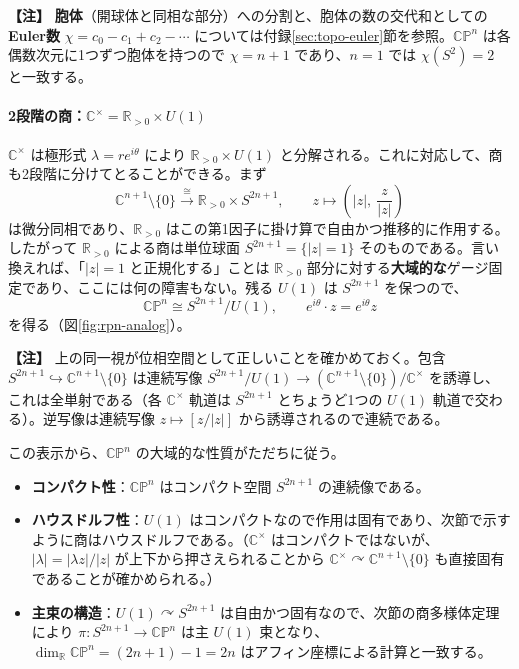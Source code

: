 \documentclass[uplatex, dvipdfmx, book]{jsbook}
\newenvironment{note}{\vspace{1ex}\par\footnotesize\noindent\textbf{【注】}}{\par\vspace{1ex}}
\begin{document}
\begin{note}
\textbf{胞体}（開球体と同相な部分）への分割と、胞体の数の交代和としての\textbf{Euler数} $\chi = c_0 - c_1 + c_2 - \cdots$ については付録\ref{sec:topo-euler}節を参照。$\mathbb{CP}^n$ は各偶数次元に1つずつ胞体を持つので $\chi = n + 1$ であり、$n = 1$ では $\chi(S^2) = 2$ と一致する。
\end{note}

\paragraph{2段階の商：$\mathbb{C}^\times = \mathbb{R}_{>0} \times U(1)$}
$\mathbb{C}^\times$ は極形式 $\lambda = r e^{i\theta}$ により $\mathbb{R}_{>0} \times U(1)$ と分解される。これに対応して、商も2段階に分けてとることができる。まず
\begin{equation}
    \mathbb{C}^{n+1} \setminus \{0\} \xrightarrow{\ \cong\ } \mathbb{R}_{>0} \times S^{2n+1}, \qquad z \mapsto \left( |z|,\ \frac{z}{|z|} \right)
\end{equation}
は微分同相であり、$\mathbb{R}_{>0}$ はこの第1因子に掛け算で自由かつ推移的に作用する。したがって $\mathbb{R}_{>0}$ による商は単位球面 $S^{2n+1} = \{ |z| = 1 \}$ そのものである。言い換えれば、「$|z| = 1$ と正規化する」ことは $\mathbb{R}_{>0}$ 部分に対する\textbf{大域的な}ゲージ固定であり、ここには何の障害もない。残る $U(1)$ は $S^{2n+1}$ を保つので、
\begin{equation}
    \mathbb{CP}^n \cong S^{2n+1} / U(1), \qquad e^{i\theta} \cdot z = e^{i\theta} z
\end{equation}
を得る（図\ref{fig:rpn-analog}）。

\begin{note}
上の同一視が位相空間として正しいことを確かめておく。包含 $S^{2n+1} \hookrightarrow \mathbb{C}^{n+1} \setminus \{0\}$ は連続写像 $S^{2n+1}/U(1) \to (\mathbb{C}^{n+1} \setminus \{0\})/\mathbb{C}^\times$ を誘導し、これは全単射である（各 $\mathbb{C}^\times$ 軌道は $S^{2n+1}$ とちょうど1つの $U(1)$ 軌道で交わる）。逆写像は連続写像 $z \mapsto [z/|z|]$ から誘導されるので連続である。
\end{note}

この表示から、$\mathbb{CP}^n$ の大域的な性質がただちに従う。
\begin{itemize}
    \item \textbf{コンパクト性}：$\mathbb{CP}^n$ はコンパクト空間 $S^{2n+1}$ の連続像である。
    \item \textbf{ハウスドルフ性}：$U(1)$ はコンパクトなので作用は固有であり、次節で示すように商はハウスドルフである。（$\mathbb{C}^\times$ はコンパクトではないが、$|\lambda| = |\lambda z| / |z|$ が上下から押さえられることから $\mathbb{C}^\times \curvearrowright \mathbb{C}^{n+1} \setminus \{0\}$ も直接固有であることが確かめられる。）
    \item \textbf{主束の構造}：$U(1) \curvearrowright S^{2n+1}$ は自由かつ固有なので、次節の商多様体定理により $\pi : S^{2n+1} \to \mathbb{CP}^n$ は主 $U(1)$ 束となり、$\dim_{\mathbb{R}} \mathbb{CP}^n = (2n+1) - 1 = 2n$ はアフィン座標による計算と一致する。
\end{itemize}
\end{document}
